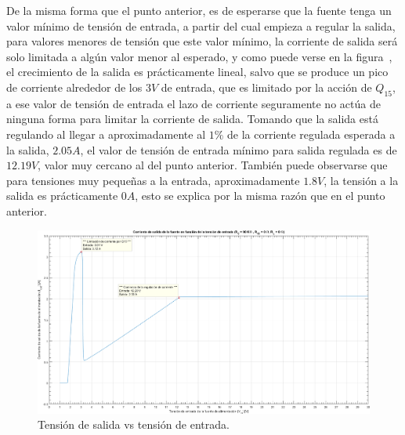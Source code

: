 De la misma forma que el punto anterior, es de esperarse que la fuente tenga un valor mínimo de tensión de entrada, a partir del cual empieza a regular la salida, para valores menores de tensión que este valor mínimo, la corriente de salida será solo limitada a algún valor menor al esperado, y como puede verse en la figura~, el crecimiento de la salida es prácticamente lineal, salvo que se produce un pico de corriente alrededor de los $3 V$ de entrada, que es limitado por la acción de $Q_{15}$, a ese valor de tensión de entrada el lazo de corriente seguramente no actúa de ninguna forma para limitar la corriente de salida. Tomando que la salida está regulando al llegar a aproximadamente al $1 \%$ de la corriente regulada esperada a la salida, $2.05 A$, el valor de tensión de entrada mínimo para salida regulada es de $12.19 V$, valor muy cercano al del punto anterior. También puede observarse que para tensiones muy pequeñas a la entrada, aproximadamente $1.8 V$, la tensión a la salida es prácticamente $0 A$, esto se explica por la misma razón que en el punto anterior.

\vfill

\clearpage

\begin{figure}[H] %
\begin{center}
\includegraphics[width=1.2 \textwidth, angle=90]{./img/preguntas/p19.png}
\caption{\label{fig:fig_p19_io_vs_vi}\footnotesize{Tensión de salida vs tensión de entrada.}}
\end{center}
\end{figure}

\clearpage